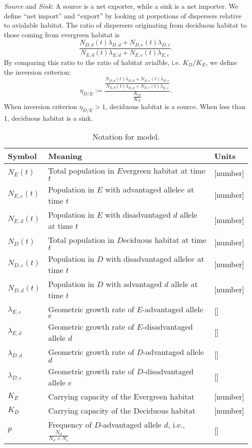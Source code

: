 \documentclass[11pt, reqno]{amsart}
\begin{document}
{\em Source} and {\em Sink}: A source is a net exporter, while a sink is a net importer. 
We define ``net import'' and ``export'' by looking at porpotions of dispersers  relative to avialable habitat. 
The ratio of dispersers originating from deciduous habitat to those coming from evergreen habitat is
  \begin{equation}\label{E:rat}
      \frac{N_{D,d}(t)\lambda_{D,d}+N_{D,e}(t)\lambda_{D,e}}{ N_{E,d}(t)\lambda_{E,d}+ N_{E,e}(t)\lambda_{E,e}}.
 \end{equation}
By comparing this ratio to the ratio of habitat avialble, i.e. $K_D/K_E$, we define the inversion criterion:
  \begin{equation}\label{E:invers}
   \eta_{D/E} := \frac{   \frac{N_{D,d}(t)\lambda_{D,d}+N_{D,e}(t)\lambda_{D,e}}{ N_{E,d}(t)\lambda_{E,d}+ N_{E,e}(t)\lambda_{E,e}}}{\frac{K_D}{K_E}}.
 \end{equation}
When inversion criterion $\eta_{D/E} > 1$, deciduous habitat is a source. When less than 1, deciduous habitat is a sink.


\begin{spacing}{1}
\begin{table}
  \renewcommand*\arraystretch{.9}
  \caption{Notation for model.}\label{T:one}
  \centering
  \begin{tabular} {@{}lp{}l@{}}
    \toprule
    Symbol &Meaning &Units\\     
    \midrule 
    $N_E(t)$ &Total population in $E$vergreen habitat at time $t$ &[number]\\    
    $N_{E,e}(t)$ &Population in $E$ with advantaged allele$e$ at time $t$ &[number]\\    
    $N_{E,d}(t)$ &Population in $E$ with disadvantaged $d$ allele at time $t$ &[number]\\    
   $N_D(t)$ &Total population in $D$eciduous habitat at time $t$ &[number]\\
    $N_{D,e}(t)$ &Population in $D$ with disadvantaged allele$e$ at time $t$ &[number]\\    
    $N_{D,d}(t)$ &Population in $D$ with advantaged $d$ allele at time $t$ &[number]\\    
   $\lambda_{E,e}$ &Geometric growth rate of $E$-advantaged allele $e$&[]\\
   $\lambda_{E,d}$ &Geometric growth rate of $E$-disadvantaged allele $d$&[]\\
   $\lambda_{D,d}$ &Geometric growth rate of $D$-advantaged allele $d$&[]\\
   $\lambda_{D,e}$ &Geometric growth rate of $D$-disadvantaged allele $e$&[]\\
   $K_E$ &Carrying capacity of the Evergreen habitat&[number]\\
   $K_D$ &Carrying capacity of the Deciduous habitat&[number]\\
   $p$      & Frequency of $D$-advantaged allele $d$, i.e., $\frac{N_d}{N_d + N_e}$ &[]\\
    \bottomrule
  \end{tabular}
\end{table}

\end{spacing}
\end{document}
